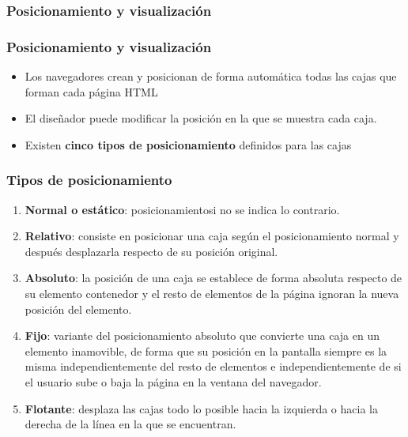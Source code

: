 \subsubsection*{Posicionamiento y visualización}


\begin{frame}
\frametitle{Posicionamiento y visualización}

\begin{itemize}
  \item Los navegadores crean y posicionan de forma automática todas las cajas que forman cada página HTML
  \item El diseñador puede modificar la posición en la que se muestra cada caja.
  \item Existen {\bf cinco tipos de posicionamiento} definidos para las cajas
\end{itemize}

\end{frame}




\begin{frame}
\frametitle{Tipos de posicionamiento}

\begin{enumerate}
  \item {\bf Normal o estático}: posicionamientosi no se indica lo contrario.
  \item{\bf Relativo}: consiste en posicionar una caja según el posicionamiento normal y después desplazarla respecto de su posición original.
  \item {\bf Absoluto}: la posición de una caja se establece de forma absoluta respecto de su elemento contenedor y el resto de elementos de la página ignoran la nueva posición del elemento.
  \item {\bf Fijo}: variante del posicionamiento absoluto que convierte una caja en un elemento inamovible, de forma que su posición en la pantalla siempre es la misma independientemente del resto de elementos e independientemente de si el usuario sube o baja la página en la ventana del navegador.
  \item {\bf Flotante}: desplaza las cajas todo lo posible hacia la izquierda o hacia la derecha de la línea en la que se encuentran.
\end{enumerate}

\end{frame}

